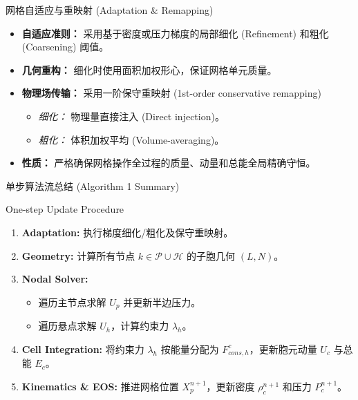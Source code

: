 \documentclass{beamer}
\begin{document}
	\begin{frame}{网格自适应与重映射 (Adaptation \& Remapping)}
		\begin{itemize}
			\item \textbf{自适应准则：} 采用基于密度或压力梯度的局部细化 (Refinement) 和粗化 (Coarsening) 阈值。
			\item \textbf{几何重构：} 细化时使用面积加权形心，保证网格单元质量。
			\item \textbf{物理场传输：} 采用一阶保守重映射 (1st-order conservative remapping)
			\begin{itemize}
				\item \textit{细化：} 物理量直接注入 (Direct injection)。
				\item \textit{粗化：} 体积加权平均 (Volume-averaging)。
			\end{itemize}
			\item \textbf{性质：} 严格确保网格操作全过程的质量、动量和总能全局精确守恒。
		\end{itemize}
	\end{frame}
	
	\begin{frame}[fragile]{单步算法流总结 (Algorithm 1 Summary)}
		\begin{exampleblock}{One-step Update Procedure}
			\small
			\begin{enumerate}
				\item \textbf{Adaptation:} 执行梯度细化/粗化及保守重映射。
				\item \textbf{Geometry:} 计算所有节点 $k \in \mathcal{P}\cup\mathcal{H}$ 的子胞几何 $(L, N)$。
				\item \textbf{Nodal Solver:}
				\begin{itemize}
					\item[a.] 遍历主节点求解 $U_p$ 并更新半边压力。
					\item[b.] 遍历悬点求解 $U_h$，计算约束力 $\lambda_h$。
				\end{itemize}
				\item \textbf{Cell Integration:} 将约束力 $\lambda_h$ 按能量分配为 $F_{cons,h}^c$，更新胞元动量 $U_c$ 与总能 $E_c$。
				\item \textbf{Kinematics \& EOS:} 推进网格位置 $X_p^{n+1}$，更新密度 $\rho_c^{n+1}$ 和压力 $P_c^{n+1}$。
			\end{enumerate}
		\end{exampleblock}
	\end{frame}
	
\end{document}
